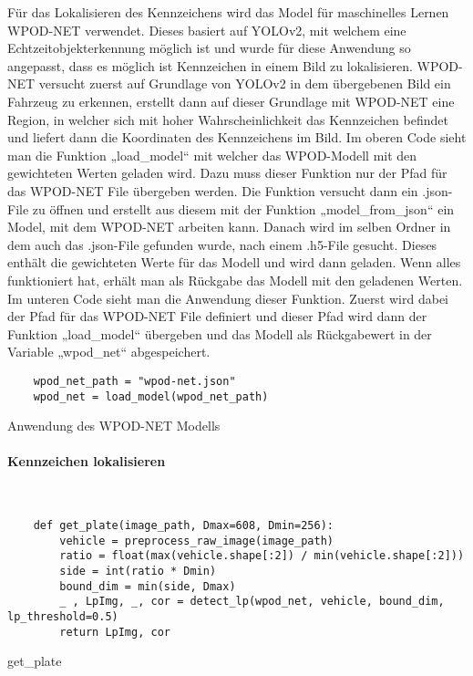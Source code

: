 Für das Lokalisieren des Kennzeichens wird das Model für maschinelles Lernen WPOD-NET verwendet. Dieses basiert auf YOLOv2, 
mit welchem eine Echtzeitobjekterkennung möglich ist und wurde für diese Anwendung so angepasst, dass es möglich ist 
Kennzeichen in einem Bild zu lokalisieren. WPOD-NET versucht zuerst auf Grundlage von YOLOv2 in dem übergebenen Bild 
ein Fahrzeug zu erkennen, erstellt dann auf dieser Grundlage mit WPOD-NET eine Region, in welcher sich mit hoher Wahrscheinlichkeit 
das Kennzeichen befindet und liefert dann die Koordinaten des Kennzeichens im Bild. Im oberen Code sieht man die Funktion 
„load{\_}model“ mit welcher das WPOD-Modell mit den gewichteten Werten geladen wird. Dazu muss dieser Funktion nur der 
Pfad für das WPOD-NET File übergeben werden. Die Funktion versucht dann ein .json-File zu öffnen und erstellt aus 
diesem mit der Funktion „model{\_}from{\_}json“ ein Model, mit dem WPOD-NET arbeiten kann. Danach wird im selben Ordner 
in dem auch das .json-File gefunden wurde, nach einem .h5-File gesucht. Dieses enthält die gewichteten Werte für das 
Modell und wird dann geladen. Wenn alles funktioniert hat, erhält man als Rückgabe das Modell mit den geladenen Werten. 
Im unteren Code sieht man die Anwendung dieser Funktion. Zuerst wird dabei der Pfad für das WPOD-NET File definiert und 
dieser Pfad wird dann der Funktion „load{\_}model“ übergeben und das Modell als Rückgabewert in der Variable „wpod{\_}net“ abgespeichert.

\begin{listing}[H]
    \begin{verbatim}
    wpod_net_path = "wpod-net.json"
    wpod_net = load_model(wpod_net_path)
    \end{verbatim}
    \caption{Anwendung des WPOD-NET Modells}
\end{listing}

\paragraph{Kennzeichen lokalisieren}\mbox{}\\

\begin{listing}[H]
    \begin{verbatim}
    def get_plate(image_path, Dmax=608, Dmin=256):
        vehicle = preprocess_raw_image(image_path)
        ratio = float(max(vehicle.shape[:2]) / min(vehicle.shape[:2]))
        side = int(ratio * Dmin)
        bound_dim = min(side, Dmax)
        _ , LpImg, _, cor = detect_lp(wpod_net, vehicle, bound_dim, lp_threshold=0.5)
        return LpImg, cor
    \end{verbatim}
    \caption{get{\_}plate}
\end{listing}

